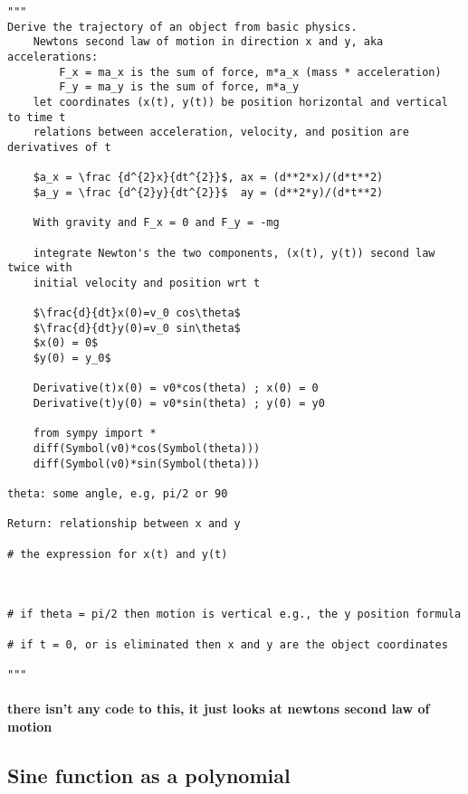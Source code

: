 \documentclass[11pt]{article}
\begin{document}
    \begin{verbatim}
"""
Derive the trajectory of an object from basic physics.
    Newtons second law of motion in direction x and y, aka accelerations:
        F_x = ma_x is the sum of force, m*a_x (mass * acceleration)
        F_y = ma_y is the sum of force, m*a_y
    let coordinates (x(t), y(t)) be position horizontal and vertical to time t
    relations between acceleration, velocity, and position are derivatives of t

    $a_x = \frac {d^{2}x}{dt^{2}}$, ax = (d**2*x)/(d*t**2)
    $a_y = \frac {d^{2}y}{dt^{2}}$  ay = (d**2*y)/(d*t**2)

    With gravity and F_x = 0 and F_y = -mg

    integrate Newton's the two components, (x(t), y(t)) second law twice with
    initial velocity and position wrt t

    $\frac{d}{dt}x(0)=v_0 cos\theta$
    $\frac{d}{dt}y(0)=v_0 sin\theta$
    $x(0) = 0$
    $y(0) = y_0$

    Derivative(t)x(0) = v0*cos(theta) ; x(0) = 0
    Derivative(t)y(0) = v0*sin(theta) ; y(0) = y0

    from sympy import *
    diff(Symbol(v0)*cos(Symbol(theta)))
    diff(Symbol(v0)*sin(Symbol(theta)))

theta: some angle, e.g, pi/2 or 90

Return: relationship between x and y

# the expression for x(t) and y(t)



# if theta = pi/2 then motion is vertical e.g., the y position formula

# if t = 0, or is eliminated then x and y are the object coordinates

"""
\end{verbatim}

\hypertarget{there-isnt-any-code-to-this-it-just-looks-at-newtons-second-law-of-motion}{%
\paragraph{there isn't any code to this, it just looks at newtons second
law of
motion}\label{there-isnt-any-code-to-this-it-just-looks-at-newtons-second-law-of-motion}}

    \hypertarget{sine-function-as-a-polynomial}{%
\subsection{Sine function as a
polynomial}\label{sine-function-as-a-polynomial}}
\end{document}
